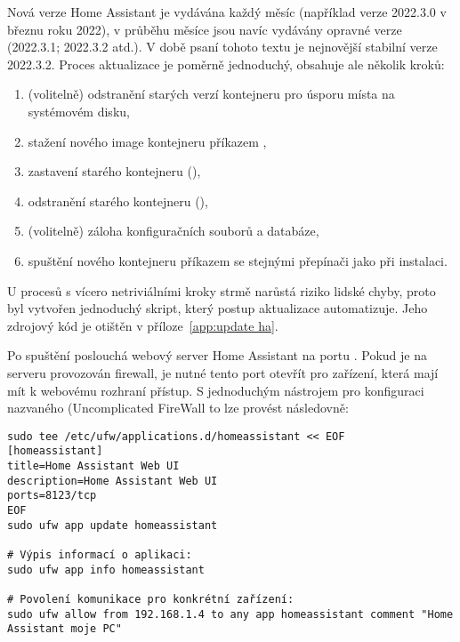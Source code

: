 Nová verze Home Assistant je vydávána každý měsíc (například verze 2022.3.0
v březnu roku 2022), v průběhu měsíce jsou navíc vydávány opravné verze
(2022.3.1; 2022.3.2 atd.). V době psaní tohoto textu je nejnovější stabilní
verze 2022.3.2.
Proces aktualizace je poměrně jednoduchý, obsahuje ale několik kroků:
\begin{enumerate}
    \item (volitelně) odstranění starých verzí kontejneru pro úsporu místa na
        systémovém disku,

    \item stažení nového image kontejneru příkazem ,

    \item zastavení starého kontejneru (),

    \item odstranění starého kontejneru (),

    \item (volitelně) záloha konfiguračních souborů a databáze,

    \item spuštění nového kontejneru příkazem  se stejnými
        přepínači jako při instalaci.
\end{enumerate}
U procesů s vícero netriviálními kroky strmě narůstá riziko lidské chyby,
proto byl vytvořen jednoduchý skript, který postup aktualizace automatizuje.
Jeho zdrojový kód je otištěn v příloze~\vref{app:update ha}.

Po spuštění poslouchá webový server Home Assistant na portu .
Pokud je na serveru provozován firewall, je nutné tento port otevřít pro
zařízení, která mají mít k webovému rozhraní přístup. S jednoduchým nástrojem
pro konfiguraci  nazvaného 
(\foreignlanguage{english}{Uncomplicated FireWall} to lze provést následovně:
\begin{lstlisting}[language=mybash]
sudo tee /etc/ufw/applications.d/homeassistant << EOF
[homeassistant]
title=Home Assistant Web UI
description=Home Assistant Web UI
ports=8123/tcp
EOF
sudo ufw app update homeassistant

# Výpis informací o aplikaci:
sudo ufw app info homeassistant

# Povolení komunikace pro konkrétní zařízení:
sudo ufw allow from 192.168.1.4 to any app homeassistant comment "Home Assistant moje PC"
\end{lstlisting}


